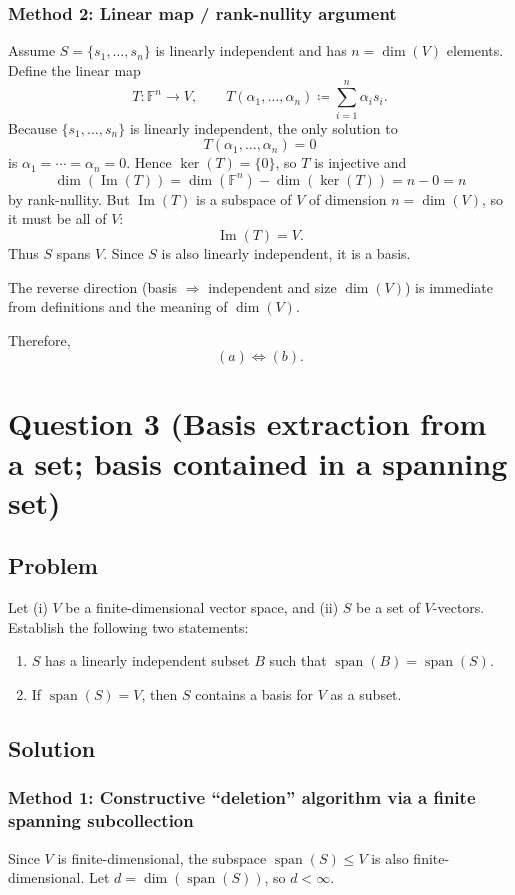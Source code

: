 \documentclass[12pt]{article}
\newcommand{\F}{\mathbb{F}}
\newcommand{\Span}{\operatorname{span}}
\newcommand{\dimn}{\operatorname{dim}}
\begin{document}
\subsubsection{Method 2: Linear map / rank-nullity argument}
Assume \(S=\{s_1,\ldots,s_n\}\) is linearly independent and has \(n=\dimn(V)\) elements.
Define the linear map
\[
T:\F^n\to V,
\qquad
T(\alpha_1,\ldots,\alpha_n)\coloneqq \sum_{i=1}^n \alpha_i s_i.
\]
Because \(\{s_1,\ldots,s_n\}\) is linearly independent, the only solution to
\[
T(\alpha_1,\ldots,\alpha_n)=0
\]
is \(\alpha_1=\cdots=\alpha_n=0\).
Hence \(\ker(T)=\{0\}\), so \(T\) is injective and
\[
\dimn(\operatorname{Im}(T))=\dimn(\F^n)-\dimn(\ker(T))=n-0=n
\]
by rank-nullity.
But \(\operatorname{Im}(T)\) is a subspace of \(V\) of dimension \(n=\dimn(V)\), so it must be all of \(V\):
\[
\operatorname{Im}(T)=V.
\]
Thus \(S\) spans \(V\).
Since \(S\) is also linearly independent, it is a basis.

The reverse direction (basis \(\Rightarrow\) independent and size \(\dimn(V)\)) is immediate from definitions and the meaning of \(\dimn(V)\).

Therefore,
\[
\boxed{\ (a)\Longleftrightarrow (b).\ }
\]

\newpage
\section{Question 3 (Basis extraction from a set; basis contained in a spanning set)}
\subsection{Problem}
Let (i) \(V\) be a finite-dimensional vector space, and (ii) \(S\) be a set of \(V\)-vectors.
Establish the following two statements:
\begin{enumerate}[label=(\alph*)]
\item \(S\) has a linearly independent subset \(B\) such that \(\Span(B)=\Span(S)\).
\item If \(\Span(S)=V\), then \(S\) contains a basis for \(V\) as a subset.
\end{enumerate}

\subsection{Solution}

\subsubsection{Method 1: Constructive ``deletion'' algorithm via a finite spanning subcollection}
Since \(V\) is finite-dimensional, the subspace \(\Span(S)\le V\) is also finite-dimensional.
Let \(d=\dimn(\Span(S))\), so \(d<\infty\).
\end{document}

